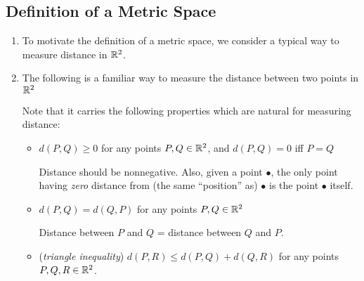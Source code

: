 \subsection{Definition of a Metric Space}
\begin{enumerate}
\item To motivate the definition of a metric space, we consider a typical way
to measure distance in \(\mathbb{R}^2\).
\item The following is a familiar way to measure the distance between two
points in \(\mathbb{R}^2\)
\begin{center}
\end{center}
Note that it carries the following properties which are natural for measuring
distance:
\begin{itemize}
\item \(d(P,Q)\ge 0\) for any points \(P,Q\in\mathbb{R}^{2}\), and \(d(P,Q)=0\) iff \(P=Q\)
\begin{intuition} Distance should be nonnegative. Also, given a point
\(\bullet\), the only point having \emph{zero} distance from (the same
``position'' as) \(\bullet\) is the point \(\bullet\) itself.
 \end{intuition}
\item \(d(P,Q)=d(Q,P)\) for any points \(P,Q\in\mathbb{R}^{2}\) \begin{intuition}
Distance between \(P\) and \(Q\) = distance between \(Q\) and \(P\).
\end{intuition}
\item (\emph{triangle inequality}) \(d(P,R)\le d(P,Q)+d(Q,R)\) for any points
\(P,Q,R\in\mathbb{R}^{2}\).
\begin{center}
\end{center}
\end{itemize}
\end{enumerate}
